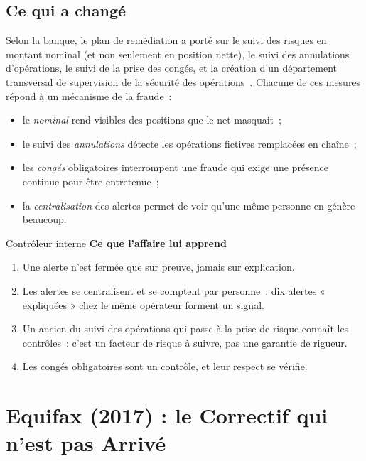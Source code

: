 \subsection{Ce qui a changé}

Selon la banque, le plan de remédiation a porté sur le suivi des risques en
montant nominal (et non seulement en position nette), le suivi des
annulations d'opérations, le suivi de la prise des congés, et la création
d'un département transversal de supervision de la sécurité des
opérations~\cite{sg2016kerviel}. Chacune de ces mesures répond à un
mécanisme de la fraude~:
\begin{itemize}
    \item le \emph{nominal} rend visibles des positions que le net
          masquait~;
    \item le suivi des \emph{annulations} détecte les opérations fictives
          remplacées en chaîne~;
    \item les \emph{congés} obligatoires interrompent une fraude qui exige
          une présence continue pour être entretenue~;
    \item la \emph{centralisation} des alertes permet de voir qu'une même
          personne en génère beaucoup.
\end{itemize}

\begin{boxmetier}{Contrôleur interne}
\textbf{Ce que l'affaire lui apprend}
\begin{enumerate}
    \item Une alerte n'est fermée que sur preuve, jamais sur explication.
    \item Les alertes se centralisent et se comptent par personne~: dix
          alertes « expliquées » chez le même opérateur forment un signal.
    \item Un ancien du suivi des opérations qui passe à la prise de risque
          connaît les contrôles~: c'est un facteur de risque à suivre, pas
          une garantie de rigueur.
    \item Les congés obligatoires sont un contrôle, et leur respect se
          vérifie.
\end{enumerate}
\end{boxmetier}

\section{Equifax (2017) : le Correctif qui n'est pas Arrivé}
\label{sec:c02-equifax}

